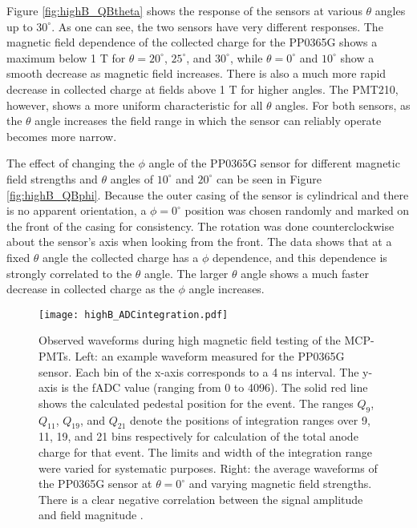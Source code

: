 Figure \ref{fig:highB_QBtheta} shows the response of the sensors at various $\theta$ angles up to $30^{\circ}$. As one can see, the two sensors have very different responses. The magnetic field dependence of the collected charge for the PP0365G shows a maximum below 1 T for $\theta = 20^{\circ}$, $25^{\circ}$, and $30^{\circ}$, while $\theta = 0^{\circ}$ and $10^{\circ}$ show a smooth decrease as magnetic field increases. There is also a much more rapid decrease in collected charge at fields above 1 T for higher angles. The PMT210, however, shows a more uniform characteristic for all $\theta$ angles. For both sensors, as the $\theta$ angle increases the field range in which the sensor can reliably operate becomes more narrow.

The effect of changing the $\phi$ angle of the PP0365G sensor for different magnetic field strengths and $\theta$ angles of $10^{\circ}$ and $20^{\circ}$ can be seen in Figure \ref{fig:highB_QBphi}. Because the outer casing of the sensor is cylindrical and there is no apparent orientation, a $\phi = 0^{\circ}$ position was chosen randomly and marked on the front of the casing for consistency. The rotation was done counterclockwise about the sensor's axis when looking from the front. The data shows that at a fixed $\theta$ angle the collected charge has a $\phi$ dependence, and this dependence is strongly correlated to the $\theta$ angle. The larger $\theta$ angle shows a much faster decrease in collected charge as the $\phi$ angle increases.

\begin{figure}[!htb]
	\centering
	\texttt{[image: highB\_ADCintegration.pdf]}
	\caption[Observed waveforms during high magnetic field testing of the MCP-PMTs.]{Observed waveforms during high magnetic field testing of the MCP-PMTs. Left: an example waveform measured for the PP0365G sensor. Each bin of the x-axis corresponds to a 4 ns interval. The y-axis is the fADC value (ranging from 0 to 4096). The solid red line shows the calculated pedestal position for the event. The ranges $Q_9$, $Q_{11}$, $Q_{19}$, and $Q_{21}$ denote the positions of integration ranges over 9, 11, 19, and 21 bins respectively for calculation of the total anode charge for that event. The limits and width of the integration range were varied for systematic purposes. Right: the average waveforms of the PP0365G sensor at $\theta = 0^{\circ}$ and varying magnetic field strengths. There is a clear negative correlation between the signal amplitude and field magnitude \cite{HighB_DIRC2015}.}
	\label{fig:highB_waveform}
\end{figure}

